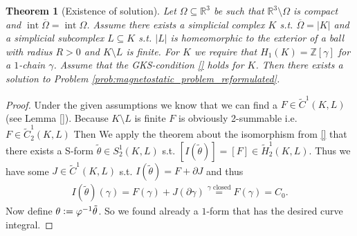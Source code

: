 \documentclass[12pt,a4paper]{article}
\numberwithin{equation}{subsection}
\numberwithin{lemma}{subsection}
\newtheorem{theorem}[lemma]{Theorem}
\theoremstyle{definition}
\DeclareMathOperator{\interior}{int}
\newcommand{\integers}{\mathbb{Z}}
\newcommand{\omegabar}{\overline{\Omega}}
\newcommand{\real}{\mathbb{R}}
\begin{document}
\begin{theorem}[Existence of solution]
    Let $\Omega \subseteq \real^3$ be such that $\real^3 \setminus \Omega$
    is compact and $\interior \omegabar = \interior \Omega$. Assume there 
    exists a simplicial complex $K$ s.t. $\omegabar = |K|$ and a simplicial
    subcomplex $L \subseteq K$ s.t. $|L|$ is homeomorphic to the exterior 
    of a ball with radius $R > 0$ and $K \setminus L$ is finite. 
    For $K$ we require that $H_1(K) = \integers [\gamma]$ for a $1$-chain 
    $\gamma$.
    Assume that 
    the GKS-condition \ref{} holds for $K$. Then there exists a solution 
    to Problem \ref{prob:magnetostatic_problem_reformulated}.
\end{theorem}
\begin{proof}
    Under the given assumptions we know that we can find a 
    $F \in \tilde{C}^1(K,L)$ (see Lemma \ref{}). 
    Because $K \setminus L$ is finite $F$ is obviously 2-summable 
    i.e. $F \in  \tilde{C}_2^1(K,L)$
    Then We apply the theorem about
    the isomorphism from \ref{} that there exists a 
    S-form $\tilde{\theta} \in S^1_2(K,L)$
    s.t. $[I(\tilde{\theta})] = [F] \in \tilde{H}_2^1(K,L)$. Thus 
    we have some $J \in \tilde{C}^1(K,L)$ s.t. 
    $I(\tilde{\theta}) = F + \partial J$ and thus 
    \begin{align*}
        I(\tilde{\theta})(\gamma) = F(\gamma) + J(\partial \gamma)
        \stackrel{\gamma \text{ closed}}{=} F(\gamma) = C_0.      
    \end{align*}
    Now define $\theta \vcentcolon= \varphi^{-1} \tilde{\theta}$.
    So we found already a $1$-form that has the desired curve integral.


\end{proof}
\end{document}
